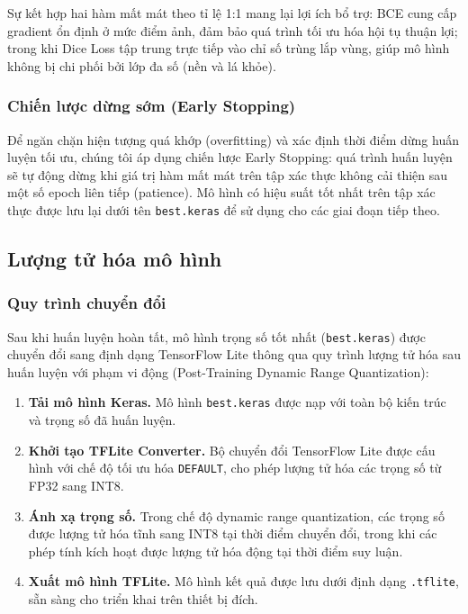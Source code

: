 \documentclass[conference]{IEEEtran}
\begin{document}
Sự kết hợp hai hàm mất mát theo tỉ lệ 1:1 mang lại lợi ích bổ trợ: BCE cung cấp gradient ổn định ở mức điểm ảnh, đảm bảo quá trình tối ưu hóa hội tụ thuận lợi; trong khi Dice Loss tập trung trực tiếp vào chỉ số trùng lắp vùng, giúp mô hình không bị chi phối bởi lớp đa số (nền và lá khỏe).

\subsubsection{Chiến lược dừng sớm (Early Stopping)}

Để ngăn chặn hiện tượng quá khớp (overfitting) và xác định thời điểm dừng huấn luyện tối ưu, chúng tôi áp dụng chiến lược Early Stopping: quá trình huấn luyện sẽ tự động dừng khi giá trị hàm mất mát trên tập xác thực không cải thiện sau một số epoch liên tiếp (patience). Mô hình có hiệu suất tốt nhất trên tập xác thực được lưu lại dưới tên \texttt{best.keras} để sử dụng cho các giai đoạn tiếp theo.

\subsection{Lượng tử hóa mô hình}

\subsubsection{Quy trình chuyển đổi}

Sau khi huấn luyện hoàn tất, mô hình trọng số tốt nhất (\texttt{best.keras}) được chuyển đổi sang định dạng TensorFlow Lite thông qua quy trình lượng tử hóa sau huấn luyện với phạm vi động (Post-Training Dynamic Range Quantization):

\begin{enumerate}
  \item \textbf{Tải mô hình Keras.} Mô hình \texttt{best.keras} được nạp với toàn bộ kiến trúc và trọng số đã huấn luyện.
  \item \textbf{Khởi tạo TFLite Converter.} Bộ chuyển đổi TensorFlow Lite được cấu hình với chế độ tối ưu hóa \texttt{DEFAULT}, cho phép lượng tử hóa các trọng số từ FP32 sang INT8.
  \item \textbf{Ánh xạ trọng số.} Trong chế độ dynamic range quantization, các trọng số được lượng tử hóa tĩnh sang INT8 tại thời điểm chuyển đổi, trong khi các phép tính kích hoạt được lượng tử hóa động tại thời điểm suy luận.
  \item \textbf{Xuất mô hình TFLite.} Mô hình kết quả được lưu dưới định dạng \texttt{.tflite}, sẵn sàng cho triển khai trên thiết bị đích.
\end{enumerate}
\end{document}
